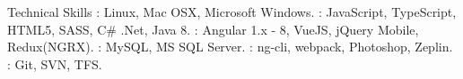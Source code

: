 \documentclass{resume}
\author{Rahmathullah M}
\begin{document}
\maketitle



\begin{category}{Technical Skills}
  : Linux, Mac OSX, Microsoft Windows.
  : JavaScript, TypeScript, HTML5, SASS, C\# .Net, Java 8.
  : Angular 1.x - 8, VueJS, jQuery Mobile, Redux(NGRX).
  : MySQL, MS SQL Server.
  : ng-cli, webpack, Photoshop, Zeplin.
  : Git, SVN, TFS.
\end{category} 

\end{document}
